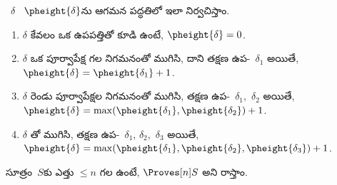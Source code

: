 \documentclass[../../../include/open-logic-section]{subfiles}
\begin{document}


\begin{defn}
~$\delta$ \emph{}~$\pheight{\delta}$ను ఆగమన పద్ధతిలో ఇలా నిర్వచిస్తాం.
\begin{enumerate}
  \item $\delta$ కేవలం ఒక ఉపపత్తితో కూడి ఉంటే, $\pheight{\delta} = 0$.
  \item $\delta$ ఒక పూర్వాపేక్ష గల నిగమనంతో ముగిసి, దాని తక్షణ ఉప-~$\delta_1$ అయితే, $\pheight{\delta} = \pheight{\delta_1} + 1$.
  \item $\delta$ రెండు పూర్వాపేక్షల నిగమనంతో ముగిసి, తక్షణ ఉప-~$\delta_1$,~$\delta_2$ అయితే, $\pheight{\delta} =
  \max(\pheight{\delta_1}, \pheight{\delta_2}) + 1$.
  \item $\delta$ \Elim{\lor}తో ముగిసి, తక్షణ ఉప-~$\delta_1$, $\delta_2$,~$\delta_3$ అయితే, $\pheight{\delta} =
  \max(\pheight{\delta_1}, \pheight{\delta_2}, \pheight{\delta_3}) + 1$.
\end{enumerate}
సూత్రం~$S$కు ఎత్తు $\le n$ గల  ఉంటే, $\Proves[n] S$ అని రాస్తాం.
\end{defn}
\end{document}
